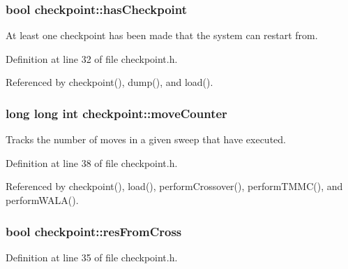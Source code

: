 \hypertarget{classcheckpoint_aa75f306fcb0c2360d948fa3a61adfed5}{
\subsubsection[{has\-Checkpoint}]{\setlength{\rightskip}{0pt plus 5cm}bool checkpoint\-::has\-Checkpoint}}\label{classcheckpoint_aa75f306fcb0c2360d948fa3a61adfed5}


At least one checkpoint has been made that the system can restart from. 



Definition at line 32 of file checkpoint.\-h.



Referenced by checkpoint(), dump(), and load().

\hypertarget{classcheckpoint_a5ab49a355714da4874aba00eb03f701d}{
\subsubsection[{move\-Counter}]{\setlength{\rightskip}{0pt plus 5cm}long long int checkpoint\-::move\-Counter}}\label{classcheckpoint_a5ab49a355714da4874aba00eb03f701d}


Tracks the number of moves in a given sweep that have executed. 



Definition at line 38 of file checkpoint.\-h.



Referenced by checkpoint(), load(), perform\-Crossover(), perform\-T\-M\-M\-C(), and perform\-W\-A\-L\-A().

\hypertarget{classcheckpoint_ac3e65d26f2b8231ae9dd7e29c72ecf3b}{
\subsubsection[{res\-From\-Cross}]{\setlength{\rightskip}{0pt plus 5cm}bool checkpoint\-::res\-From\-Cross}}\label{classcheckpoint_ac3e65d26f2b8231ae9dd7e29c72ecf3b}


Definition at line 35 of file checkpoint.\-h.



